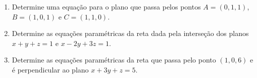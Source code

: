 
\begin{frame}[label=planos]
	\begin{casa}
\begin{enumerate}
\item Determine uma equação para o plano que passa pelos pontos $A=(0,1,1)$, $B=(1,0,1)$ e $C=(1,1,0)$.

\item Determine as equações paramétricas da reta dada pela interseção dos planos
$x+y+z=1$ e $x-2y+3z=1$.

\item Determine as equações paramétricas da reta que passa pelo ponto $(1,0,6)$ e é perpendicular ao plano $x+3y+z=5$.
\end{enumerate}
	\end{casa}
\end{frame}
